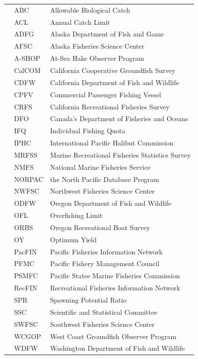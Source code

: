 \documentclass[12pt,]{article}
\begin{document}
\begin{center}
\begin{table}[ht]
\begin{tabular}{rll}
     & ABC & Allowable Biological Catch  \\ 
     & ACL  & Annual Catch Limit \\ 
     & ADFG & Alaska Department of Fish and Game \\ 
     & AFSC & Alaska Fisheries Science Center \\ 
     & A-SHOP & At-Sea Hake Observer Program  \\ 
     & CalCOM & California Cooperative Groundfish Survey  \\ 
     & CDFW & California Department of Fish and Wildlife  \\ 
     & CPFV & Commercial Passenger Fishing Vessel \\ 
     & CRFS & California Recreational Fisheries Survey \\ 
     & DFO & Canada’s Department of Fisheries and Oceans  \\ 
     & IFQ & Individual Fishing Quota \\ 
     & IPHC & International Pacific Halibut Commission \\ 
     & MRFSS & Marine Recreational Fisheries Statistics Survey  \\ 
     & NMFS & National Marine Fisheries Service  \\ 
     & NORPAC & the North Pacific Database Program \\ 
     & NWFSC & Northwest Fisheries Science Center  \\ 
     & ODFW & Oregon Department of Fish and Wildlife  \\ 
     & OFL & Overfishing Limit \\ 
     & ORBS & Oregon Recreational Boat Survey  \\ 
     & OY & Optimum Yield \\ 
     & PacFIN & Pacific Fisheries Information Network \\ 
     & PFMC & Pacific Fishery Management Council \\ 
     & PSMFC & Pacific States Marine Fisheries Commission  \\ 
     & RecFIN & Recreational Fisheries Information Network \\ 
     & SPR & Spawning Potential Ratio \\ 
     & SSC & Scientific and Statistical Committee \\ 
     & SWFSC & Southwest Fisheries Science Center  \\ 
     & WCGOP & West Coast Groundfish Observer Program  \\ 
     & WDFW & Washington Department of Fish and Wildlife  \\ 
\end{tabular}
\end{table}


\end{center}
\end{document}
